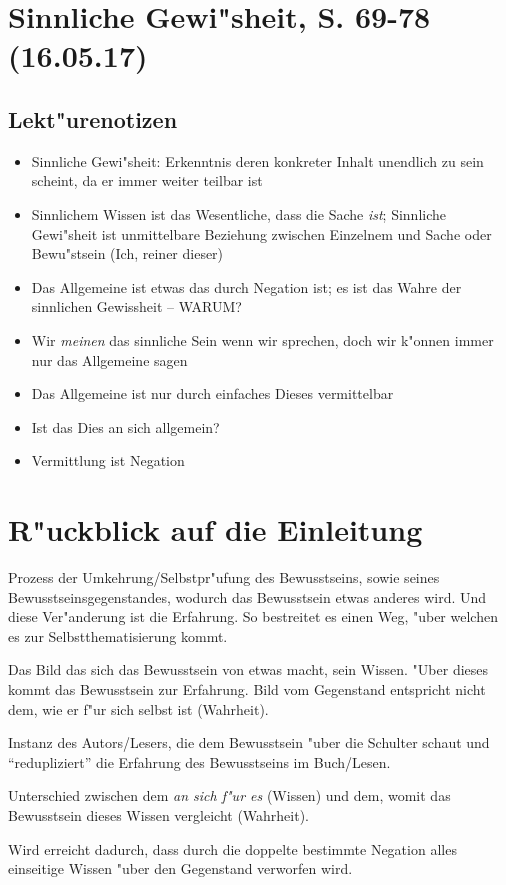 \documentclass[emulatestandardclasses]{scrartcl}
\begin{document}
\section{Sinnliche Gewi"sheit, S. 69-78\\(16.05.17)}

\subsection{Lekt"urenotizen}

\begin{itemize}
  \item Sinnliche Gewi"sheit: Erkenntnis deren konkreter Inhalt unendlich zu sein scheint, da er immer weiter teilbar ist 
  \item Sinnlichem Wissen ist das Wesentliche, dass die Sache \emph{ist}; Sinnliche Gewi"sheit ist unmittelbare Beziehung zwischen Einzelnem und Sache oder Bewu"stsein (Ich, reiner dieser)
  \item Das Allgemeine ist etwas das durch Negation ist; es ist das Wahre der sinnlichen Gewissheit -- WARUM?
  \item Wir \emph{meinen} das sinnliche Sein wenn wir sprechen, doch wir k"onnen immer nur das Allgemeine sagen
  \item Das Allgemeine ist nur durch einfaches Dieses vermittelbar
  \item Ist das Dies an sich allgemein?
  \item Vermittlung ist Negation
\end{itemize}
\section*{R"uckblick auf die Einleitung}
\begin{description}[leftmargin=!,labelwidth=\widthof{\bfseries Unterschied des Bewusstseins}]
  \item[Bewusstsein] Prozess der Umkehrung/Selbstpr"ufung des Bewusstseins, sowie seines Bewusstseinsgegenstandes, wodurch das Bewusstsein etwas anderes wird. Und diese Ver"anderung ist die Erfahrung. So bestreitet es einen Weg, "uber welchen es zur 	Selbstthematisierung kommt.
  \item[\emph{An sich f"ur es}] Das Bild das sich das Bewusstsein von etwas macht, sein Wissen. "Uber dieses kommt das Bewusstsein zur Erfahrung. Bild vom Gegenstand entspricht nicht dem, wie er f"ur sich selbst ist (Wahrheit).
  \item[Wir] Instanz des Autors/Lesers, die dem Bewusstsein "uber die Schulter schaut und "`redupliziert"' die Erfahrung des Bewusstseins im Buch/Lesen.
  \item[Unterschied des Bewusstseins] Unterschied zwischen dem \emph{an sich f"ur es} (Wissen) und dem, womit das Bewusstsein dieses Wissen vergleicht (Wahrheit).
  \item[Vollst"andigkeit der Form] Wird erreicht dadurch, dass durch die doppelte bestimmte Negation alles einseitige Wissen "uber den Gegenstand verworfen wird.
\end{description}
\end{document}
